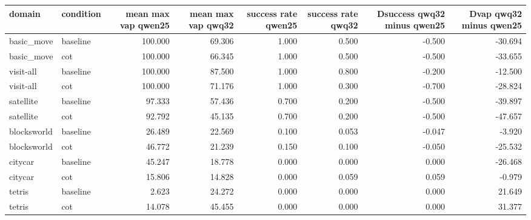 \begin{tabular}{llrrrrrr}
\toprule
domain & condition & mean max vap qwen25 & mean max vap qwq32 & success rate qwen25 & success rate qwq32 & Dsuccess qwq32 minus qwen25 & Dvap qwq32 minus qwen25 \\
\midrule
basic\_move & baseline & 100.000 & 69.306 & 1.000 & 0.500 & -0.500 & -30.694 \\
basic\_move & cot & 100.000 & 66.345 & 1.000 & 0.500 & -0.500 & -33.655 \\
visit-all & baseline & 100.000 & 87.500 & 1.000 & 0.800 & -0.200 & -12.500 \\
visit-all & cot & 100.000 & 71.176 & 1.000 & 0.300 & -0.700 & -28.824 \\
satellite & baseline & 97.333 & 57.436 & 0.700 & 0.200 & -0.500 & -39.897 \\
satellite & cot & 92.792 & 45.135 & 0.700 & 0.200 & -0.500 & -47.657 \\
blocksworld & baseline & 26.489 & 22.569 & 0.100 & 0.053 & -0.047 & -3.920 \\
blocksworld & cot & 46.772 & 21.239 & 0.150 & 0.100 & -0.050 & -25.532 \\
citycar & baseline & 45.247 & 18.778 & 0.000 & 0.000 & 0.000 & -26.468 \\
citycar & cot & 15.806 & 14.828 & 0.000 & 0.059 & 0.059 & -0.979 \\
tetris & baseline & 2.623 & 24.272 & 0.000 & 0.000 & 0.000 & 21.649 \\
tetris & cot & 14.078 & 45.455 & 0.000 & 0.000 & 0.000 & 31.377 \\
\bottomrule
\end{tabular}
